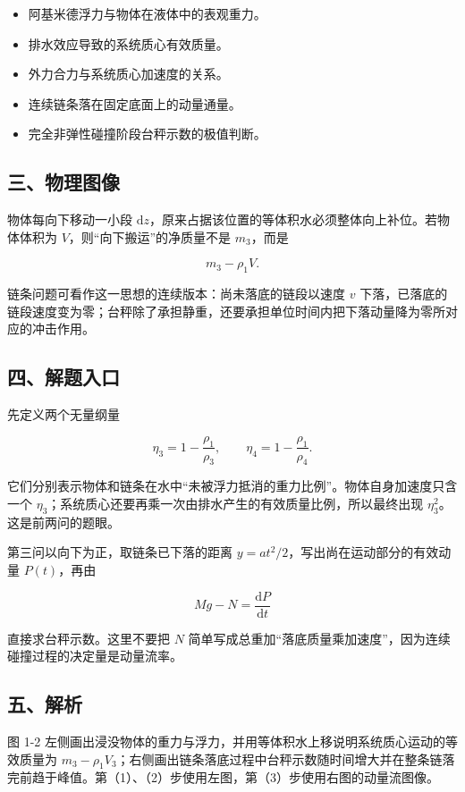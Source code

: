 \documentclass[12pt,a4paper,UTF8]{ctexart}
\newcommand{\tightlist}{\setlength{\itemsep}{0pt}\setlength{\parskip}{0pt}}
\begin{document}
\begin{itemize}
\tightlist
\item
  阿基米德浮力与物体在液体中的表观重力。
\item
  排水效应导致的系统质心有效质量。
\item
  外力合力与系统质心加速度的关系。
\item
  连续链条落在固定底面上的动量通量。
\item
  完全非弹性碰撞阶段台秤示数的极值判断。
\end{itemize}

\subsection{三、物理图像}\label{ux4e09ux7269ux7406ux56feux50cf}

物体每向下移动一小段
\(\mathrm dz\)，原来占据该位置的等体积水必须整体向上补位。若物体体积为
\(V\)，则``向下搬运''的净质量不是 \(m_3\)，而是

\[m_3-\rho_1V.\]

链条问题可看作这一思想的连续版本：尚未落底的链段以速度 \(v\)
下落，已落底的链段速度变为零；台秤除了承担静重，还要承担单位时间内把下落动量降为零所对应的冲击作用。

\subsection{四、解题入口}\label{ux56dbux89e3ux9898ux5165ux53e3}

先定义两个无量纲量

\[\eta_3=1-\frac{\rho_1}{\rho_3},\qquad
\eta_4=1-\frac{\rho_1}{\rho_4}.\]

它们分别表示物体和链条在水中``未被浮力抵消的重力比例''。物体自身加速度只含一个
\(\eta_3\)；系统质心还要再乘一次由排水产生的有效质量比例，所以最终出现
\(\eta_3^2\)。这是前两问的题眼。

第三问以向下为正，取链条已下落的距离
\(y=at^2/2\)，写出尚在运动部分的有效动量 \(P(t)\)，再由

\[Mg-N=\frac{\mathrm dP}{\mathrm dt}\]

直接求台秤示数。这里不要把 \(N\)
简单写成总重加``落底质量乘加速度''，因为连续碰撞过程的决定量是动量流率。

\subsection{五、解析}\label{ux4e94ux89e3ux6790}

图 1-2
左侧画出浸没物体的重力与浮力，并用等体积水上移说明系统质心运动的等效质量为
\(m_3-\rho_1V_3\)；右侧画出链条落底过程中台秤示数随时间增大并在整条链落完前趋于峰值。第（1）、（2）步使用左图，第（3）步使用右图的动量流图像。
\end{document}
